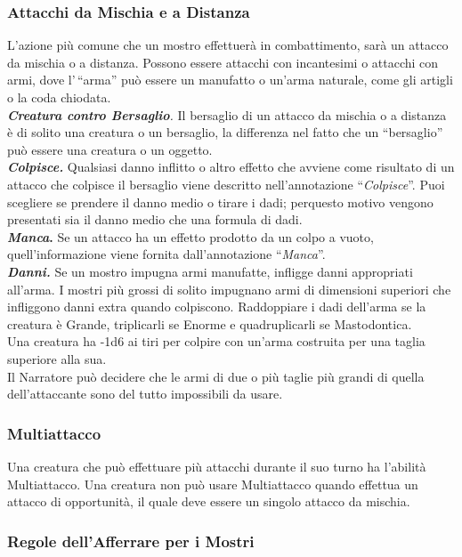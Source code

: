 \subsubsection{Attacchi da Mischia e a Distanza}

L'azione più comune che un mostro effettuerà in combattimento, sarà un attacco da mischia o a distanza. Possono essere attacchi con incantesimi o attacchi con armi, dove l'\,``arma'' può essere un manufatto o un'arma naturale, come gli artigli o la coda chiodata.\\
\emph{\textbf{Creatura contro Bersaglio}.} Il bersaglio di un attacco da mischia o a distanza è di solito una creatura o un bersaglio, la differenza nel fatto che un ``bersaglio'' può essere una creatura o un oggetto.\\
\emph{\textbf{Colpisce.}} Qualsiasi danno inflitto o altro effetto che avviene come risultato di un attacco che colpisce il bersaglio viene descritto nell'annotazione ``\emph{Colpisce}''. Puoi scegliere se prendere il danno medio o tirare i dadi; perquesto  motivo vengono presentati sia il danno medio che una formula di dadi. \\
\textbf{\emph{Manca}.} Se un attacco ha un effetto prodotto da un colpo a vuoto, quell'informazione viene fornita dall'annotazione ``\emph{Manca}''.\\
\emph{\textbf{Danni.}} Se un mostro impugna armi manufatte, infligge danni appropriati all'arma. I mostri più grossi di solito impugnano armi di dimensioni superiori che infliggono danni extra quando colpiscono. Raddoppiare i dadi dell'arma se la creatura è Grande, triplicarli se Enorme e quadruplicarli se Mastodontica.\\
Una creatura ha -1d6 ai tiri per colpire con un'arma costruita per una taglia superiore alla sua. \\
Il Narratore può decidere che le armi di due o più taglie più grandi di quella dell'attaccante sono del tutto impossibili da usare.

\subsubsection{Multiattacco}

Una creatura che può effettuare più attacchi durante il suo turno ha l'abilità Multiattacco. Una creatura non può usare Multiattacco quando effettua un attacco di opportunità, il quale deve essere un singolo attacco da mischia.

\subsubsection{Regole dell'Afferrare per i Mostri}

